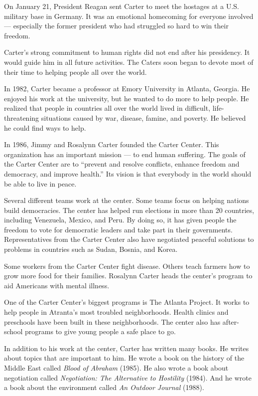 \documentclass{article}
\begin{document}
On January 21, President Reagan sent Carter to meet the hostages at a U.S. military base in Germany. It was an emotional homecoming for everyone involved --- especially the former president who had struggled so hard to win their freedom.

Carter's strong commitment to human rights did not end after his presidency. It would guide him in all future activities. The Caters soon began to devote most of their time to helping people all over the world.

In 1982, Carter became a professor at Emory University in Atlanta, Georgia. He enjoyed his work at the university, but he wanted to do more to help people. He realized that people in countries all over the world lived in difficult, life-threatening situations caused by war, disease, famine, and poverty. He believed he could find ways to help.

In 1986, Jimmy and Rosalynn Carter founded the Carter Center. This organization has an important mission --- to end human suffering. The goals of the Carter Center are to ``prevent and resolve conflicts, enhance freedom and democracy, and improve health.'' Its vision is that everybody in the world should be able to live in peace.

Several different teams work at the center. Some teams focus on helping nations build democracies. The center has helped run elections in more than 20 countries, including Venezuela, Mexico, and Peru. By doing so, it has given people the freedom to vote for democratic leaders and take part in their governments. Representatives from the Carter Center also have negotiated peaceful solutions to problems in countries such as Sudan, Bosnia, and Korea.

Some workers from the Carter Center fight disease. Others teach farmers how to grow more food for their families. Rosalynn Carter heads the center's program to aid Americans with mental illness.

One of the Carter Center's biggest programs is The Atlanta Project. It works to help people in Atranta's most troubled neighborhoods. Health clinics and preschools have been built in these neighborhoods. The center also has after-school programs to give young people a safe place to go.

In addition to his work at the center, Carter has written many books. He writes about topics that are important to him. He wrote a book on the history of the Middle East called {\it Blood of Abraham} (1985). He also wrote a book about negotiation called {\it Negotiation: The Alternative to Hostility} (1984). And he wrote a book about the environment called {\it An Outdoor Journal} (1988).
\end{document}
